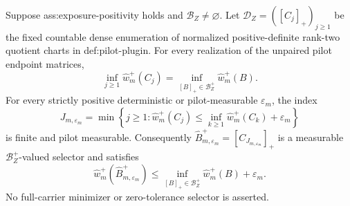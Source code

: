 Suppose ass:exposure-positivity holds and \(\mathcal B_Z\ne\varnothing\).  Let \(\mathcal D_Z=([C_j]_+)_{j\ge1}\) be the fixed countable dense enumeration of normalized positive-definite rank-two quotient charts in def:pilot-plugin.  For every realization of the unpaired pilot endpoint matrices,
\[
\inf_{j\ge1}\widehat w_m^+(C_j)
=\inf_{[B]_+\in\mathcal B_Z^+}\widehat w_m^+(B).
\]
For every strictly positive deterministic or pilot-measurable \(\varepsilon_m\), the index
\[
J_{m,\varepsilon_m}
=\min\left\{j\ge1:
\widehat w_m^+(C_j)
\le \inf_{k\ge1}\widehat w_m^+(C_k)+\varepsilon_m\right\}
\]
is finite and pilot measurable.  Consequently \(\widehat B_{m,\varepsilon_m}^+=[C_{J_{m,\varepsilon_m}}]_+\) is a measurable \(\mathcal B_Z^+\)-valued selector and satisfies
\[
\widehat w_m^+(\widehat B_{m,\varepsilon_m}^+)
\le
\inf_{[B]_+\in\mathcal B_Z^+}\widehat w_m^+(B)+\varepsilon_m.
\]
No full-carrier minimizer or zero-tolerance selector is asserted.